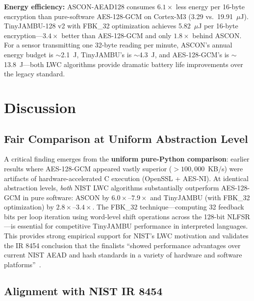 \documentclass[11pt,a4paper]{article}
\begin{document}
\textbf{Energy efficiency:} ASCON-AEAD128 consumes $6.1\times$ less energy per 16-byte encryption than pure-software AES-128-GCM on Cortex-M3 (3.29 vs.\ 19.91~$\mu$J). TinyJAMBU-128 v2 with FBK\_32 optimization achieves 5.82~$\mu$J per 16-byte encryption---$3.4\times$ better than AES-128-GCM and only $1.8\times$ behind ASCON. For a sensor transmitting one 32-byte reading per minute, ASCON's annual energy budget is $\sim$2.1~J, TinyJAMBU's is $\sim$4.3~J, and AES-128-GCM's is $\sim$13.8~J---both LWC algorithms provide dramatic battery life improvements over the legacy standard.


\section{Discussion}

\subsection{Fair Comparison at Uniform Abstraction Level}

A critical finding emerges from the \textbf{uniform pure-Python comparison}: earlier results where AES-128-GCM appeared vastly superior ($>100,000$~KB/s) were artifacts of hardware-accelerated C execution (OpenSSL + AES-NI). At identical abstraction levels, \textit{both} NIST LWC algorithms substantially outperform AES-128-GCM in pure software: ASCON by $6.0\times$--$7.9\times$ and TinyJAMBU (with FBK\_32 optimization) by $2.8\times$--$3.4\times$. The FBK\_32 technique---computing 32 feedback bits per loop iteration using word-level shift operations across the 128-bit NLFSR---is essential for competitive TinyJAMBU performance in interpreted languages. This provides strong empirical support for NIST's LWC motivation and validates the IR 8454 conclusion that the finalists ``showed performance advantages over current NIST AEAD and hash standards in a variety of hardware and software platforms''~\cite{nistir8454}.

\subsection{Alignment with NIST IR 8454}
\end{document}
